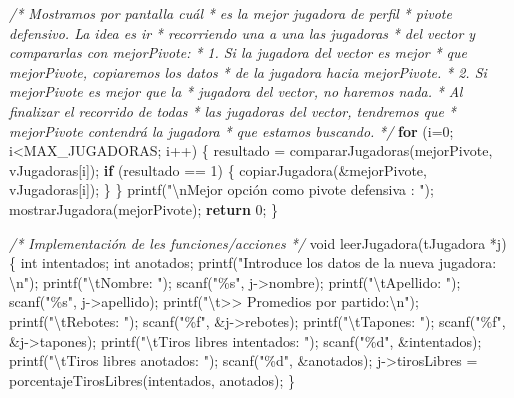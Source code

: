 \documentclass[
]{book}
\newenvironment{Shaded}{\begin{snugshade}}{\end{snugshade}}
\newcommand{\CommentTok}[1]{\textcolor[rgb]{0.56,0.35,0.01}{\textit{#1}}}
\newcommand{\ControlFlowTok}[1]{\textcolor[rgb]{0.13,0.29,0.53}{\textbf{#1}}}
\newcommand{\DataTypeTok}[1]{\textcolor[rgb]{0.13,0.29,0.53}{#1}}
\newcommand{\DecValTok}[1]{\textcolor[rgb]{0.00,0.00,0.81}{#1}}
\newcommand{\NormalTok}[1]{#1}
\newcommand{\SpecialCharTok}[1]{\textcolor[rgb]{0.00,0.00,0.00}{#1}}
\newcommand{\StringTok}[1]{\textcolor[rgb]{0.31,0.60,0.02}{#1}}
\begin{document}
\begin{Shaded}
\begin{Highlighting}[]
    \CommentTok{/* Mostramos por pantalla cuál}
\CommentTok{     * es la mejor jugadora de perfil}
\CommentTok{     * pivote defensivo. La idea es ir}
\CommentTok{     * recorriendo una a una las jugadoras}
\CommentTok{     * del vector y compararlas con mejorPivote:}
\CommentTok{     * 1. Si la jugadora del vector es mejor}
\CommentTok{     *    que mejorPivote, copiaremos los datos}
\CommentTok{     *    de la jugadora hacia mejorPivote.}
\CommentTok{     * 2. Si mejorPivote es mejor que la}
\CommentTok{     *    jugadora del vector, no haremos nada.}
\CommentTok{     * Al finalizar el recorrido de todas}
\CommentTok{     * las jugadoras del vector, tendremos que}
\CommentTok{     * mejorPivote contendrá la jugadora}
\CommentTok{     * que estamos buscando.}
\CommentTok{     */}
    \ControlFlowTok{for}\NormalTok{ (i=}\DecValTok{0}\NormalTok{; i\textless{}MAX\_JUGADORAS; i++) \{}
\NormalTok{        resultado = compararJugadoras(mejorPivote, vJugadoras[i]);}
        \ControlFlowTok{if}\NormalTok{ (resultado == }\DecValTok{1}\NormalTok{) \{}
\NormalTok{            copiarJugadora(\&mejorPivote, vJugadoras[i]);}
\NormalTok{        \}}
\NormalTok{    \}}
\NormalTok{    printf(}\StringTok{"}\SpecialCharTok{\textbackslash{}n}\StringTok{Mejor opción como pivote defensiva : "}\NormalTok{);}
\NormalTok{    mostrarJugadora(mejorPivote);}
    \ControlFlowTok{return} \DecValTok{0}\NormalTok{;}
\NormalTok{\}}

\CommentTok{/* Implementación de les funciones/acciones */}
\DataTypeTok{void}\NormalTok{ leerJugadora(tJugadora *j) \{}
    \DataTypeTok{int}\NormalTok{ intentados;}
    \DataTypeTok{int}\NormalTok{ anotados;}
\NormalTok{    printf(}\StringTok{"Introduce los datos de la nueva jugadora: }\SpecialCharTok{\textbackslash{}n}\StringTok{"}\NormalTok{);}
\NormalTok{    printf(}\StringTok{"}\SpecialCharTok{\textbackslash{}t}\StringTok{Nombre: "}\NormalTok{);}
\NormalTok{    scanf(}\StringTok{"\%s"}\NormalTok{, j{-}\textgreater{}nombre);}
\NormalTok{    printf(}\StringTok{"}\SpecialCharTok{\textbackslash{}t}\StringTok{Apellido: "}\NormalTok{);}
\NormalTok{    scanf(}\StringTok{"\%s"}\NormalTok{, j{-}\textgreater{}apellido);}
\NormalTok{    printf(}\StringTok{"}\SpecialCharTok{\textbackslash{}t}\StringTok{\textgreater{}\textgreater{} Promedios por partido:}\SpecialCharTok{\textbackslash{}n}\StringTok{"}\NormalTok{);}
\NormalTok{    printf(}\StringTok{"}\SpecialCharTok{\textbackslash{}t}\StringTok{Rebotes: "}\NormalTok{);}
\NormalTok{    scanf(}\StringTok{"\%f"}\NormalTok{, \&j{-}\textgreater{}rebotes);}
\NormalTok{    printf(}\StringTok{"}\SpecialCharTok{\textbackslash{}t}\StringTok{Tapones: "}\NormalTok{);}
\NormalTok{    scanf(}\StringTok{"\%f"}\NormalTok{, \&j{-}\textgreater{}tapones);}
\NormalTok{    printf(}\StringTok{"}\SpecialCharTok{\textbackslash{}t}\StringTok{Tiros libres intentados: "}\NormalTok{);}
\NormalTok{    scanf(}\StringTok{"\%d"}\NormalTok{, \&intentados);}
\NormalTok{    printf(}\StringTok{"}\SpecialCharTok{\textbackslash{}t}\StringTok{Tiros libres anotados: "}\NormalTok{);}
\NormalTok{    scanf(}\StringTok{"\%d"}\NormalTok{, \&anotados);}
\NormalTok{    j{-}\textgreater{}tirosLibres = porcentajeTirosLibres(intentados, anotados);}
\NormalTok{\}}


\end{Highlighting}
\end{Shaded}
\end{document}
